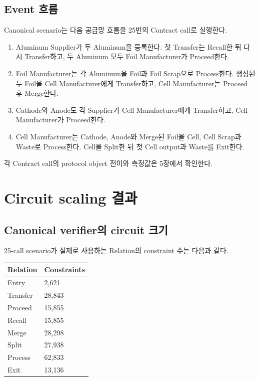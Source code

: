\documentclass[11pt,a4paper]{extarticle}
\begin{document}
\subsection{Event 흐름}

Canonical scenario는 다음 공급망 흐름을 25번의 Contract call로 실행한다.

\begin{enumerate}
  \item Aluminum Supplier가 두 Aluminum을 등록한다. 첫 Transfer는 Recall한 뒤 다시
        Transfer하고, 두 Aluminum 모두 Foil Manufacturer가 Proceed한다.
  \item Foil Manufacturer는 각 Aluminum을 Foil과 Foil Scrap으로 Process한다. 생성된 두
        Foil을 Cell Manufacturer에게 Transfer하고, Cell Manufacturer는 Proceed 후 Merge한다.
  \item Cathode와 Anode도 각 Supplier가 Cell Manufacturer에게 Transfer하고, Cell
        Manufacturer가 Proceed한다.
  \item Cell Manufacturer는 Cathode, Anode와 Merge된 Foil을 Cell, Cell Scrap과 Waste로
        Process한다. Cell을 Split한 뒤 첫 Cell output과 Waste를 Exit한다.
\end{enumerate}

각 Contract call의 protocol object 전이와 측정값은 5장에서 확인한다.

\clearpage
\section{Circuit scaling 결과}

\subsection{Canonical verifier의 circuit 크기}

25-call scenario가 실제로 사용하는 Relation의 constraint 수는 다음과 같다.

\begin{center}
  \begin{tabular}{@{}p{}l@{}}
    \toprule
    Relation & Constraints \\
    \midrule
    Entry    & 2,621       \\
    Transfer & 28,843      \\
    Proceed  & 15,855      \\
    Recall   & 15,855      \\
    Merge    & 28,298      \\
    Split    & 27,938      \\
    Process  & 62,833      \\
    Exit     & 13,136      \\
    \bottomrule
  \end{tabular}
\end{center}
\end{document}
